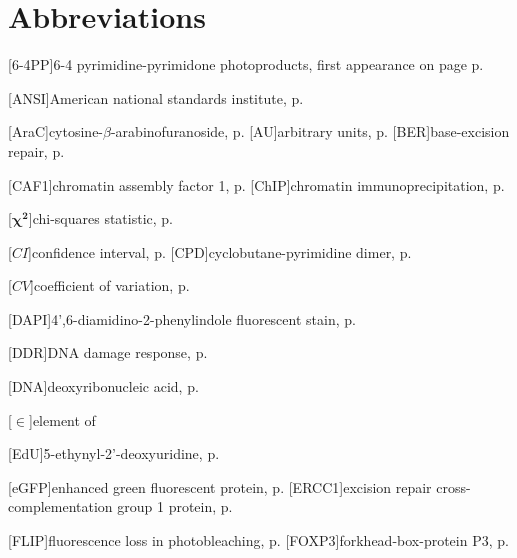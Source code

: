 
\chapter{Abbreviations}
\pagestyle{plain5}
\begin{acronym}



[6-4PP]{6-4 pyrimidine-pyrimidone photoproducts, first appearance on page p. \pageref{sec:intro_reg_repair}}

[ANSI]{American national standards institute, p. \pageref{sec:ANSI}}

[AraC]{cytosine-$\beta$-arabinofuranoside, p. \pageref{sec:FLIP}}
[AU]{arbitrary units, p. \pageref{fig:DNArepairKinetic}}
[BER]{base-excision repair, p. \pageref{sec:intro_reg_repair}}


[CAF1]{chromatin assembly factor 1, p. \pageref{sec:NERmechanism}}
[ChIP]{chromatin immunoprecipitation, p. \pageref{par:schip}}

[$\boldsymbol{\chi^{2}}$]{chi-squares statistic, p. \pageref{eqn:chiSquare}}

[$\boldsymbol{ \mathit{CI}}$]{confidence interval, p. \pageref{eqn:confidenceIntervals}}
[CPD]{cyclobutane-pyrimidine dimer, p. \pageref{sec:intro_reg_repair}}

[$\boldsymbol{ \mathit{CV} }$]{coefficient of variation, p. \pageref{chap:quantData}}


[DAPI]{4',6-diamidino-2-phenylindole fluorescent stain, p. \pageref{sec:DAPI}}

[DDR]{DNA damage response, p. \pageref{sec:intro_DDR}}





[DNA]{deoxyribonucleic acid, p. \pageref{sec:intro_DNAdamage}}


[$\boldsymbol{\in}$]{element of}

[EdU]{5-ethynyl-2'-deoxyuridine, p. \pageref{chap:quantData}}


[eGFP]{enhanced green fluorescent protein, p. \pageref{sec:eGFP}}
[ERCC1]{excision repair cross-complementation group 1 protein, p. \pageref{sec:NERmechanism}} 


[FLIP]{fluorescence loss in photobleaching, p. \pageref{chap:quantData}}
[FOXP3]{forkhead-box-protein P3, p. \pageref{sec:FOXp3}}



\end{acronym}
